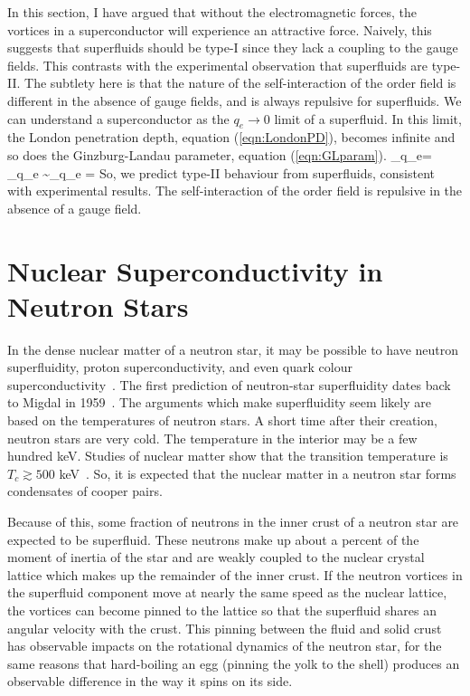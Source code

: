 In this section, I have argued that without the electromagnetic 
forces, the vortices in a superconductor will experience an 
attractive force. Naively, this suggests that superfluids 
should be type-I since they lack a coupling to the gauge fields.
This contrasts with the experimental observation that 
superfluids are type-II. The subtlety here is that the 
nature of the self-interaction of the order field is different 
in the absence of gauge fields, and is always repulsive for 
superfluids. We can understand a superconductor as the $q_e \to 0$
limit of a superfluid. In this limit, the London penetration depth, equation 
(\ref{eqn:LondonPD}), becomes infinite and so does the Ginzburg-Landau
parameter, equation (\ref{eqn:GLparam}).
\be
	\lim_{q_e}\kappa = \lim_{q_e} 
	\sim \lim_{q_e} = \infty
\ee
So, we predict type-II behaviour from superfluids, consistent with 
experimental results. The self-interaction of the order field 
is repulsive in the absence of a gauge field.

\section{Nuclear Superconductivity in Neutron Stars}

In the dense nuclear matter of a neutron star, it may be possible 
to have neutron superfluidity, proton superconductivity, and 
even quark colour superconductivity~\cite{2006pfsb.book..135S, schmitt2010dense}. 
The first prediction of 
neutron-star superfluidity dates back to Migdal in 1959~\cite{1959NucPh..13..655M}.
The arguments which make superfluidity seem likely are based on 
the temperatures of neutron stars. A short time after their 
creation, neutron stars are very cold. The temperature in the 
interior may be a few hundred keV. Studies of nuclear matter 
show that the transition temperature is 
$T_c \gtrsim 500$ keV~\cite{1989tns..conf..457S}.
So, it is expected that the nuclear matter in a neutron star 
forms condensates of cooper pairs.

Because of this, some fraction of neutrons in the inner crust 
of a neutron star are expected to be superfluid. These neutrons make up 
about a percent of the moment of inertia of the star and are 
weakly coupled to the nuclear crystal lattice which makes up the 
remainder of the inner crust. If the neutron vortices in the 
superfluid component move at nearly the same speed as the nuclear 
lattice, the vortices can become pinned to the lattice so that the 
superfluid shares an angular velocity with the crust. 
This pinning between the fluid and solid crust has observable impacts 
on the rotational dynamics of the neutron star, for the same reasons that 
hard-boiling an egg (pinning the yolk to the shell) produces an 
observable difference in the way it spins on its side.

